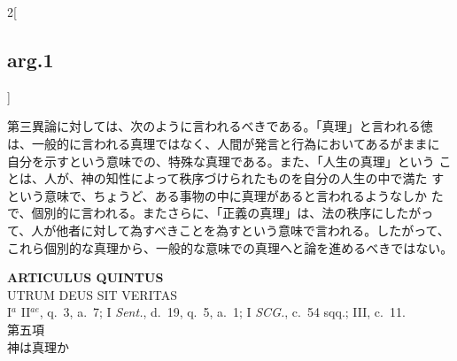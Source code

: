 \documentclass[paper=a4paper,fontsize=10pt,jafontsize=9pt,titlepage]{jlreq}
\begin{document}
\begin{paracol}{2}[\subsection{arg.1}]
\switchcolumn

第三異論に対しては、次のように言われるべきである。「真理」と言われる徳
は、一般的に言われる真理ではなく、人間が発言と行為においてあるがままに
自分を示すという意味での、特殊な真理である。また、「人生の真理」という
ことは、人が、神の知性によって秩序づけられたものを自分の人生の中で満た
すという意味で、ちょうど、ある事物の中に真理があると言われるようなしか
たで、個別的に言われる。またさらに、「正義の真理」は、法の秩序にしたがっ
て、人が他者に対して為すべきことを為すという意味で言われる。したがって、
これら個別的な真理から、一般的な意味での真理へと論を進めるべきではない。

\end{paracol}
\newpage


{}
\setcounter{section}{5}
\setcounter{subsection}{0}
\begin{center}
 {\Large {\bfseries ARTICULUS QUINTUS}}\\
 {\large UTRUM DEUS SIT VERITAS}\\
 {\footnotesize I$^a$ II$^{ae}$, q.~3, a.~7; I {\itshape Sent.}, d.~19,
 q.~5, a.~1; I {\itshape SCG.}, c.~54 sqq.; III, c.~11.}\\
 {\Large 第五項\\神は真理か}
\end{center}
\end{document}
